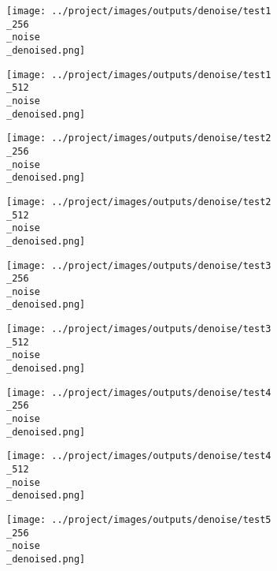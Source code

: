 \begin{figure}[!ht]
   \centering
\begin{subfigure}[t]{0.15\textwidth}
    \texttt{[image: ../project/images/outputs/denoise/test1\\\_256\\\_noise\\\_denoised.png]}
    \caption{}
    \centering
  \end{subfigure}
\begin{subfigure}[t]{0.15\textwidth}
    \texttt{[image: ../project/images/outputs/denoise/test1\\\_512\\\_noise\\\_denoised.png]}
    \caption{}
    \centering
  \end{subfigure}
\begin{subfigure}[t]{0.15\textwidth}
    \texttt{[image: ../project/images/outputs/denoise/test2\\\_256\\\_noise\\\_denoised.png]}
    \caption{}
    \centering
  \end{subfigure}
\begin{subfigure}[t]{0.15\textwidth}
    \texttt{[image: ../project/images/outputs/denoise/test2\\\_512\\\_noise\\\_denoised.png]}
    \caption{}
    \centering
  \end{subfigure}
\begin{subfigure}[t]{0.15\textwidth}
    \texttt{[image: ../project/images/outputs/denoise/test3\\\_256\\\_noise\\\_denoised.png]}
    \caption{}
    \centering
  \end{subfigure}
\begin{subfigure}[t]{0.15\textwidth}
    \texttt{[image: ../project/images/outputs/denoise/test3\\\_512\\\_noise\\\_denoised.png]}
    \caption{}
    \centering
  \end{subfigure}
\begin{subfigure}[t]{0.15\textwidth}
    \texttt{[image: ../project/images/outputs/denoise/test4\\\_256\\\_noise\\\_denoised.png]}
    \caption{}
    \centering
  \end{subfigure}
\begin{subfigure}[t]{0.15\textwidth}
    \texttt{[image: ../project/images/outputs/denoise/test4\\\_512\\\_noise\\\_denoised.png]}
    \caption{}
    \centering
  \end{subfigure}
\begin{subfigure}[t]{0.15\textwidth}
    \texttt{[image: ../project/images/outputs/denoise/test5\\\_256\\\_noise\\\_denoised.png]}
    \caption{}
    \centering
  \end{subfigure}
\begin{subfigure}[t]{0.15\textwidth}

\end{subfigure}
\end{figure}
